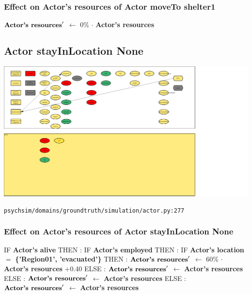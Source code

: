 \documentclass{article}%
\begin{document}
%
\subsubsection{Effect on Actor's resources of Actor moveTo shelter1}%
\label{ssubsec:Effect on Actor's resources of Actor moveTo shelter1}%
\begin{flushleft}%
$\mbox{\textbf{Actor's resources}} '$%
$\leftarrow$%
0\%%
$\cdot$%
\textbf{Actor's resources}%
\end{flushleft}

%
\subsection{Actor stayInLocation None}%
\label{subsec:Actor stayInLocation None}%
\includegraphics[width=\textwidth]{images/Actor-stayInLocation.png}%
\begin{flushleft}%
\verb|psychsim/domains/groundtruth/simulation/actor.py:277|%
\end{flushleft}%
\subsubsection{Effect on Actor's resources of Actor stayInLocation None}%
\label{ssubsec:Effect on Actor's resources of Actor stayInLocation None}%
\begin{flushleft}%
IF %
\textbf{Actor's alive}%
\linebreak%
\hspace*{2em}%
THEN %
: %
IF %
\textbf{Actor's employed}%
\linebreak%
\hspace*{4em}%
THEN %
: %
IF %
\textbf{Actor's location}%
$=$%
\textbf{\{'Region01', 'evacuated'\}}%
\linebreak%
\hspace*{6em}%
THEN %
: %
$\mbox{\textbf{Actor's resources}} '$%
$\leftarrow$%
60\%%
$\cdot$%
\textbf{Actor's resources}%
+0.40%
\linebreak%
\hspace*{6em}%
ELSE %
: %
$\mbox{\textbf{Actor's resources}} '$%
$\leftarrow$%
\textbf{Actor's resources}%
\linebreak%
\hspace*{4em}%
ELSE %
: %
$\mbox{\textbf{Actor's resources}} '$%
$\leftarrow$%
\textbf{Actor's resources}%
\linebreak%
\hspace*{2em}%
ELSE %
: %
$\mbox{\textbf{Actor's resources}} '$%
$\leftarrow$%
\textbf{Actor's resources}%
\end{flushleft}
\end{document}
